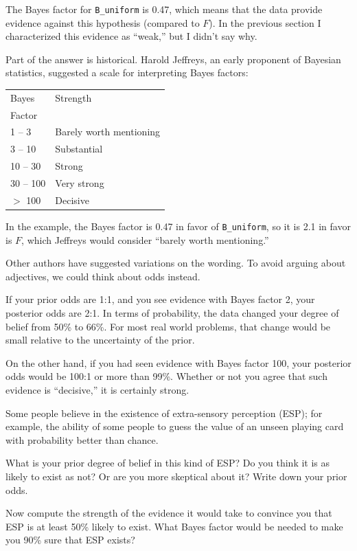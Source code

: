 \documentclass[12pt]{book}
\begin{document}
The Bayes factor for \verb"B_uniform" is 0.47, which means
that the data provide evidence against this hypothesis (compared
to $F$).  In the previous section I characterized this evidence
as ``weak,'' but I didn't say why.

Part of the answer is historical.  Harold Jeffreys, an early
proponent of Bayesian statistics, suggested a scale for
interpreting Bayes factors:

\begin{tabular}{|l|l|}
\hline
Bayes & Strength \\
Factor & \\
\hline
1 -- 3 & Barely worth mentioning \\
3 -- 10 & Substantial \\
10 -- 30 & Strong \\
30 -- 100 & Very strong \\
$>$ 100 & Decisive \\
\hline
\end{tabular}

In the example, the Bayes factor is 0.47 in favor of \verb"B_uniform",
so it is 2.1 in favor is $F$, which Jeffreys would consider
``barely worth mentioning.''

Other authors have suggested variations on the wording.  To
avoid arguing about adjectives, we could think about odds instead.

If your prior odds are 1:1, and you see evidence with Bayes
factor 2, your posterior odds are 2:1.  In terms of probability,
the data changed your degree of belief from 50\% to 66\%.  For
most real world problems, that change would be small relative
to the uncertainty of the prior.

On the other hand, if you had seen evidence with Bayes
factor 100, your posterior odds would be 100:1 or more than 99\%.
Whether or not you agree that such evidence is ``decisive,''
it is certainly strong.

\begin{exercise}
Some people believe in the existence of extra-sensory
perception (ESP); for example, the ability of some people to guess
the value of an unseen playing card with probability better
than chance.

What is your prior degree of belief in this kind of ESP?
Do you think it is as likely to exist as not?  Or are you
more skeptical about it?  Write down your prior odds.

Now compute the strength of the evidence it would take to
convince you that ESP is at least 50\% likely to exist.
What Bayes factor would be needed to make you 90\% sure
that ESP exists?
\end{exercise}
\end{document}
